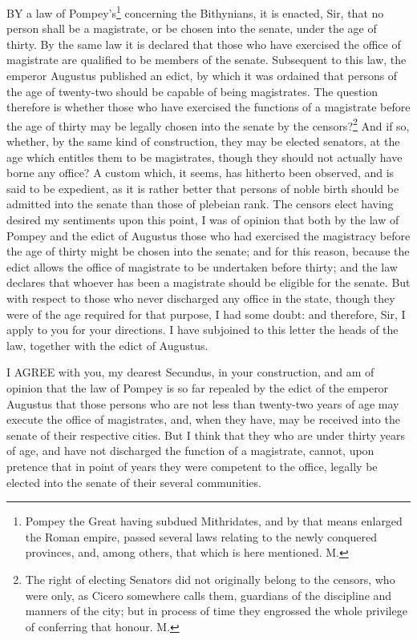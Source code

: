 BY a law of Pompey's\footnote{Pompey the Great
having subdued Mithridates, and by that means enlarged the Roman empire,
passed several laws relating to the newly conquered provinces, and, among
others, that which is here mentioned. M.} concerning the Bithynians, it is enacted,
Sir, that no person shall be a magistrate, or be chosen into the senate,
under the age of thirty. By the same law it is declared that those who
have exercised the office of magistrate are qualified to be members of the
senate. Subsequent to this law, the emperor Augustus published an edict,
by which it was ordained that persons of the age of twenty-two should be
capable of being magistrates. The question therefore is whether those who
have exercised the functions of a magistrate before the age of thirty may
be legally chosen into the senate by the censors?\footnote{The right of electing
Senators did not originally belong to the censors, who were only, as
Cicero somewhere calls them, guardians of the discipline and manners of
the city; but in process of time they engrossed the whole privilege of
conferring that honour. M.} And if so,
whether, by the same kind of construction, they may be elected senators,
at the age which entitles them to be magistrates, though they should not
actually have borne any office? A custom which, it seems, has hitherto
been observed, and is said to be expedient, as it is rather better that
persons of noble birth should be admitted into the senate than those of
plebeian rank. The censors elect having desired my sentiments upon this
point, I was of opinion that both by the law of Pompey and the edict of
Augustus those who had exercised the magistracy before the age of thirty
might be chosen into the senate; and for this reason, because the edict
allows the office of magistrate to be undertaken before thirty; and the
law declares that whoever has been a magistrate should be eligible for the
senate. But with respect to those who never discharged any office in the
state, though they were of the age required for that purpose, I had some
doubt: and therefore, Sir, I apply to you for your directions. I have
subjoined to this letter the heads of the law, together with the edict of
Augustus.


I AGREE with you, my dearest Secundus, in your construction, and am of
opinion that the law of Pompey is so far repealed by the edict of the
emperor Augustus that those persons who are not less than twenty-two years
of age may execute the office of magistrates, and, when they have, may be
received into the senate of their respective cities. But I think that they
who are under thirty years of age, and have not discharged the function of
a magistrate, cannot, upon pretence that in point of years they were
competent to the office, legally be elected into the senate of their
several communities.

